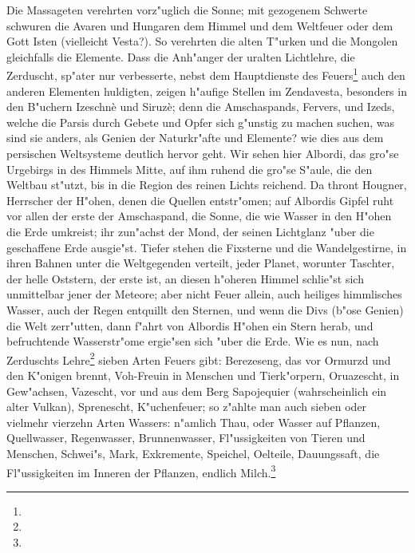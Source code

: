 \documentclass[a4paper, 11pt, oneside, polutonikogreek, german]{article}
\begin{document}
Die Massageten verehrten vorz"uglich die Sonne; mit gezogenem Schwerte schwuren die Avaren und Hungaren dem Himmel und dem Weltfeuer oder dem Gott Isten (vielleicht Vesta?). So verehrten die alten T"urken und die Mongolen gleichfalls die Elemente. Dass die Anh"anger der uralten Lichtlehre, die Zerduscht, sp"ater nur verbesserte, nebst dem Hauptdienste des Feuers\footnote{} auch den anderen Elementen huldigten, zeigen h"aufige Stellen im Zendavesta, besonders in den B"uchern Izeschnè und Siruzè; denn die Amschaspands, Fervers, und Izeds, welche die Parsis durch Gebete und Opfer sich g"unstig zu machen suchen, was sind sie anders, als Genien der Naturkr"afte und Elemente? wie dies aus dem persischen Weltsysteme deutlich hervor geht. Wir sehen hier Albordi, das gro"se Urgebirgs in des Himmels Mitte, auf ihm ruhend die gro"se S"aule, die den Weltbau st"utzt, bis in die Region des reinen Lichts reichend. Da thront Hougner, Herrscher der H"ohen, denen die Quellen entstr"omen; auf Albordis Gipfel ruht vor allen der erste der Amschaspand, die Sonne, die wie Wasser in den H"ohen die Erde umkreist; ihr zun"achst der Mond, der seinen Lichtglanz "uber die geschaffene Erde ausgie"st. Tiefer stehen die Fixsterne und die Wandelgestirne, in ihren Bahnen unter die Weltgegenden verteilt, jeder Planet, worunter Taschter, der helle Oststern, der erste ist, an diesen h"oheren Himmel schlie"st sich unmittelbar jener der Meteore; aber nicht Feuer allein, auch heiliges himmlisches Wasser, auch der Regen entquillt den Sternen, und wenn die Divs (b"ose Genien) die Welt zerr"utten, dann f"ahrt von Albordis H"ohen ein Stern herab, und befruchtende Wasserstr"ome ergie"sen sich "uber die Erde. Wie es nun, nach Zerduschts Lehre\footnote{} sieben Arten Feuers gibt: Berezeseng, das vor Ormurzd und den K"onigen brennt, Voh-Freuin in Menschen und Tierk"orpern, Oruazescht, in Gew"achsen, Vazescht, vor und aus dem Berg Sapojequier (wahrscheinlich ein alter Vulkan), Sprenescht, K"uchenfeuer; so z"ahlte man auch sieben oder vielmehr vierzehn Arten Wassers: n"amlich Thau, oder Wasser auf Pflanzen, Quellwasser, Regenwasser, Brunnenwasser, Fl"ussigkeiten von Tieren und Menschen, Schwei"s, Mark, Exkremente, Speichel, Oelteile, Dauungssaft, die Fl"ussigkeiten im Inneren der Pflanzen, endlich Milch.\footnote{}
\end{document}
